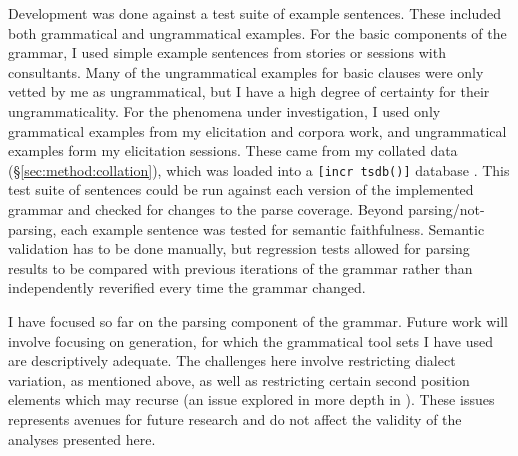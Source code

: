 
Development was done against a test suite of example sentences. These included both grammatical and ungrammatical examples. For the basic components of the grammar, I used simple example sentences from stories or sessions with consultants. Many of the ungrammatical examples for basic clauses were only vetted by me as ungrammatical, but I have a high degree of certainty for their ungrammaticality. For the phenomena under investigation, I used only grammatical examples from my elicitation and corpora work, and ungrammatical examples form my elicitation sessions. These came from my collated data (\S\ref{sec:method:collation}), which was loaded into a \texttt{[incr tsdb()]} database \citep{oepen2001}. This test suite of sentences could be run against each version of the implemented grammar and checked for changes to the parse coverage. Beyond parsing/not-parsing, each example sentence was tested for semantic faithfulness. Semantic validation has to be done manually, but regression tests allowed for parsing results to be compared with previous iterations of the grammar rather than independently reverified every time the grammar changed.

I have focused so far on the parsing component of the grammar. Future work will involve focusing on generation, for which the grammatical tool sets I have used are descriptively adequate. The challenges here involve restricting dialect variation, as mentioned above, as well as restricting certain second position elements which may recurse (an issue explored in more depth in \citealt{bender2010reweaving}). These issues represents avenues for future research and do not affect the validity of the analyses presented here.

